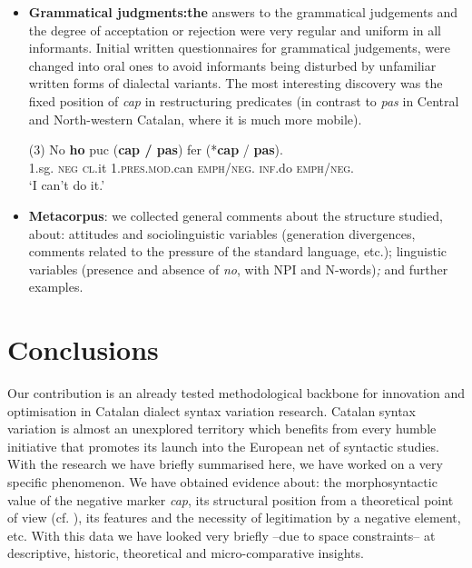 \documentclass[output=paper]{LSP/langsci}
\begin{document}
\begin{itemize}
\item \textbf{Grammatical judgments:}\textbf{\textmd{the}} answers to the grammatical judgements and the degree of acceptation or rejection were very regular and uniform in all informants. Initial written questionnaires for grammatical judgements, were changed into oral ones to avoid informants being disturbed by unfamiliar written forms of dialectal variants. The most interesting discovery was the fixed position of \textit{cap }in restructuring predicates (in contrast to \textit{pas }in Central and North-western Catalan, where it is much more mobile).

\ea
\label{ex:}
(3)
 {No} \textbf{ho} {puc}   {(\texttt{\textsuperscript{\checkmark}}\textbf{cap / pas})}   {fer} {(*\textbf{cap} / \texttt{\textsuperscript{\checkmark}}\textbf{pas}).}\\
{1.sg.}  {\textsc{neg}}   {\textsc{cl}.it}  {1.\textsc{pres.mod}.can}  {\textsc{emph}/\textsc{neg}.}  {\textsc{inf}.do} {\textsc{emph}/\textsc{neg}.}\\
\glt `I can’t do it.'\\
\z

\item \textbf{Metacorpus}: we collected general comments about the structure studied, about: attitudes and sociolinguistic variables (generation divergences, comments related to the pressure of the standard language, etc.); linguistic variables (presence and absence of \textit{no}, with NPI and N-words)\textit{; }and further examples. 
\end{itemize}

\section{Conclusions}
Our contribution is an already tested methodological backbone for innovation and optimisation in Catalan dialect syntax variation research. Catalan syntax variation is almost an unexplored territory which benefits from every humble initiative that promotes  its launch into the European net of syntactic studies. With the research we have briefly summarised here, we have worked on a very specific phenomenon. We have obtained evidence about: the morphosyntactic value of the negative marker \textit{cap}, its structural position from a theoretical point of view (cf. \citealt{llop_negacio_2013,llop_cap_2014}), its features and the necessity of legitimation by a negative element, etc. With this data we have looked very briefly –due to space constraints– at descriptive, historic, theoretical and micro-comparative insights. 
\end{document}
